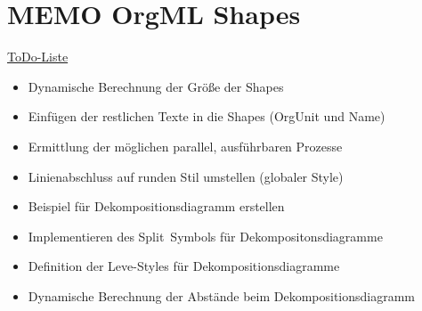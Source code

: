 \documentclass[a4paper]{article}
\begin{document}
\section*{MEMO OrgML Shapes}
\underline{ToDo-Liste}
\begin{itemize}
	\item {Dynamische Berechnung der Größe der Shapes}
	\item {Einfügen der restlichen Texte in die Shapes (OrgUnit und Name)}
	\item {Ermittlung der möglichen parallel, ausführbaren Prozesse}
	\item {Linienabschluss auf runden Stil umstellen (globaler Style)}
	\item {Beispiel für Dekompositionsdiagramm erstellen}
	\item {Implementieren des \glqq Split\grqq \ Symbols für Dekompositonsdiagramme}
	\item {Definition der Leve-Styles für Dekompositionsdiagramme}
	\item {Dynamische Berechnung der Abstände beim Dekompositionsdiagramm}
\end{itemize}
\end{document}
